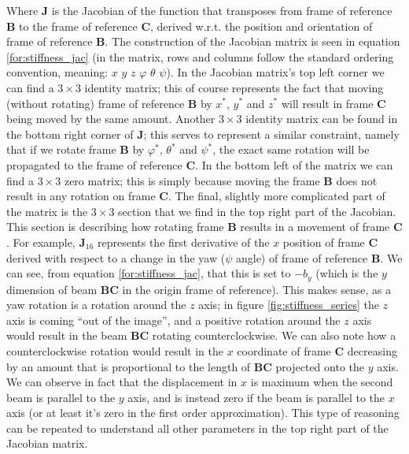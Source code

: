 \noindent
Where $\mathbf{J}$ is the Jacobian of the function that transposes from frame of reference
$\mathbf{B}$ to the frame of reference $\mathbf{C}$, derived w.r.t. the position and orientation
of frame of reference $\mathbf{B}$. The construction of the Jacobian matrix is seen
in equation \ref{for:stiffness_jac} (in the matrix, rows and columns follow the standard
ordering convention, meaning: $x$ $y$ $z$ $\varphi$ $\theta$ $\psi$).
In the Jacobian matrix's top left corner we can find a $3 \times 3$ identity matrix;
this of course represents the fact that moving (without rotating) frame of reference
$\mathbf{B}$ by $x^*$, $y^*$ and $z^*$ will result in frame $\mathbf{C}$ being
moved by the same amount.
Another $3 \times 3$ identity matrix can be found in the bottom right corner of $\mathbf{J}$;
this serves to represent a similar constraint, namely that if we rotate frame $\mathbf{B}$
by $\varphi^*$, $\theta^*$ and $\psi^*$, the exact same rotation will be propagated
to the frame of reference $\mathbf{C}$.
In the bottom left of the matrix we can find a $3 \times 3$ zero matrix; this is simply
because moving the frame $\mathbf{B}$ does not result in any rotation on frame $\mathbf{C}$.
The final, slightly more complicated part of the matrix is the $3 \times 3$ section that
we find in the top right part of the Jacobian. This section is describing how rotating
frame $\mathbf{B}$ results in a movement of frame $\mathbf{C}$.
For example, $\mathbf{J}_{16}$ represents the first derivative of the $x$ position
of frame $\mathbf{C}$ derived with respect to a change in the yaw ($\psi$ angle)
of frame of reference $\mathbf{B}$. We can see, from equation \ref{for:stiffness_jac},
that this is set to $-b_y$ (which is the $y$ dimension of beam $\mathbf{BC}$ in the origin
frame of reference). This makes sense, as a yaw rotation is a rotation around the $z$ axis;
in figure \ref{fig:stiffness_series} the $z$ axis is coming ``out of the image'', and a positive
rotation around the $z$ axis would result in the beam $\mathbf{BC}$ rotating counterclockwise.
We can also note how a counterclockwise rotation would result in the $x$ coordinate of frame $\mathbf{C}$
decreasing by an amount that is proportional to the length of $\mathbf{BC}$ projected onto the $y$ axis.
We can observe in fact that the displacement in $x$ is maximum when the second beam is parallel to the $y$ axis,
and is instead zero if the beam is parallel to the $x$ axis (or at least it's zero in the first order approximation).
This type of reasoning can be repeated to understand all other parameters in the top right part of the
Jacobian matrix.

